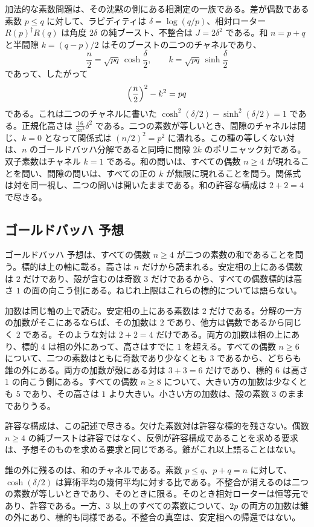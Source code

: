 \documentclass[a4paper]{article}
\theoremstyle{definition}
\theoremstyle{remark}
\begin{document}
加法的な素数問題は、その沈黙の側にある相測定の一族である。差が偶数である素数 \(p\le q\) に対して、ラピディティは \(\delta=\log(q/p)\)、相対ローター \(R(p)^\dagger R(q)\) は角度 \(2\delta\) の純ブースト、不整合は \(J=2\delta^2\) である。和 \(n=p+q\) と半間隙 \(k=(q-p)/2\) はそのブーストの二つのチャネルであり、
\[
\frac n2=\sqrt{pq}\,\cosh\frac\delta2,\qquad k=\sqrt{pq}\,\sinh\frac\delta2
\]
であって、したがって
\[
\Bigl(\frac n2\Bigr)^2-k^2=pq
\]
である。これは二つのチャネルに書いた \(\cosh^2(\delta/2)-\sinh^2(\delta/2)=1\) である。正規化高さは \(\frac{16}{3\pi^2}\delta^2\) である。二つの素数が等しいとき、間隙のチャネルは閉じ、\(k=0\) となって関係式は \((n/2)^2=p^2\) に潰れる。この種の等しくない対は、\(n\) のゴールドバッハ分解であると同時に間隙 \(2k\) のポリニャック対である。双子素数はチャネル \(k=1\) である。和の問いは、すべての偶数 \(n\ge 4\) が現れることを問い、間隙の問いは、すべての正の \(k\) が無限に現れることを問う。関係式は対を同一視し、二つの問いは開いたままである。和の許容な構成は \(2+2=4\) で尽きる。

\subsection{ゴールドバッハ 予想}

ゴールドバッハ 予想は、すべての偶数 \(n\ge 4\) が二つの素数の和であることを問う。標的は上の軸に載る。高さは \(n\) だけから読まれる。安定相の上にある偶数は \(2\) だけであり、殻が含むのは奇数 \(3\) だけであるから、すべての偶数標的は高さ \(1\) の面の向こう側にある。ねじれ上限はこれらの標的については語らない。

加数は同じ軸の上で読む。安定相の上にある素数は \(2\) だけである。分解の一方の加数がそこにあるならば、その加数は \(2\) であり、他方は偶数であるから同じく \(2\) である。そのような対は \(2+2=4\) だけである。両方の加数は相の上にあり、標的 \(4\) は相の外にあって、高さはすでに \(1\) を超える。すべての偶数 \(n\ge 6\) について、二つの素数はともに奇数であり少なくとも \(3\) であるから、どちらも錐の外にある。両方の加数が殻にある対は \(3+3=6\) だけであり、標的 \(6\) は高さ \(1\) の向こう側にある。すべての偶数 \(n\ge 8\) について、大きい方の加数は少なくとも \(5\) であり、その高さは \(1\) より大きい。小さい方の加数は、殻の素数 \(3\) のままでありうる。

許容な構成は、この記述で尽きる。欠けた素数対は許容な標的を残さない。偶数 \(n\ge 4\) の純ブーストは許容ではなく、反例が許容構成であることを求める要求は、予想そのものを求める要求と同じである。錐がこれ以上語ることはない。

錐の外に残るのは、和のチャネルである。素数 \(p\le q\)、\(p+q=n\) に対して、\(\cosh(\delta/2)\) は算術平均の幾何平均に対する比である。不整合が消えるのは二つの素数が等しいときであり、そのときに限る。そのとき相対ローターは恒等元であり、許容である。一方、\(3\) 以上のすべての素数について、\(2p\) の両方の加数は錐の外にあり、標的も同様である。不整合の真空は、安定相への帰還ではない。
\end{document}

